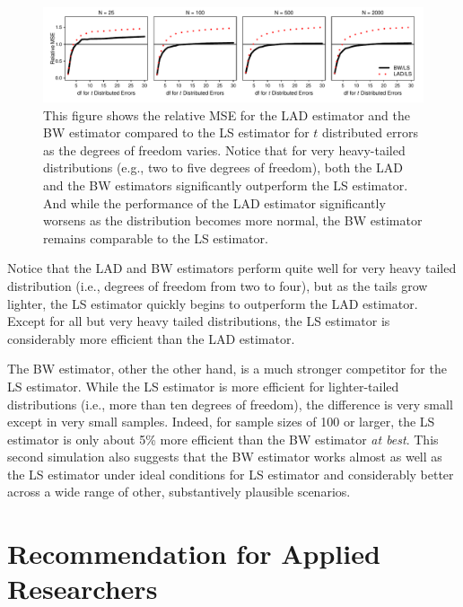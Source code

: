 \documentclass[12pt]{article}
\begin{document}
\begin{figure}[h!]
\begin{center}
\includegraphics[width = \textwidth]{figs/mc-sims.pdf}
\caption{This figure shows the relative MSE for the LAD estimator and the BW estimator compared to the LS estimator for $t$ distributed errors as the degrees of freedom varies. 
Notice that for very heavy-tailed distributions (e.g., two to five degrees of freedom), both the LAD and the BW estimators significantly outperform the LS estimator. 
And while the performance of the LAD estimator significantly worsens as the distribution becomes more normal, the BW estimator remains comparable to the LS estimator.}\label{fig:mc-sims}
\end{center}
\end{figure}

Notice that the LAD and BW estimators perform quite well for very heavy tailed distribution (i.e., degrees of freedom from two to four), but as the tails grow lighter, the LS estimator quickly begins to outperform the LAD estimator. 
Except for all but very heavy tailed distributions, the LS estimator is considerably more efficient than the LAD estimator. 

The BW estimator, other the other hand, is a much stronger competitor for the LS estimator. 
While the LS estimator is more efficient for lighter-tailed distributions (i.e., more than ten degrees of freedom), the difference is very small except in very small samples. 
Indeed, for sample sizes of 100 or larger, the LS estimator is only about 5\% more efficient than the BW estimator \textit{at best}. 
This second simulation also suggests that the BW estimator works almost as well as the LS estimator under ideal conditions for LS estimator and considerably better across a wide range of other, substantively plausible scenarios.

\section*{Recommendation for Applied Researchers}
\end{document}
